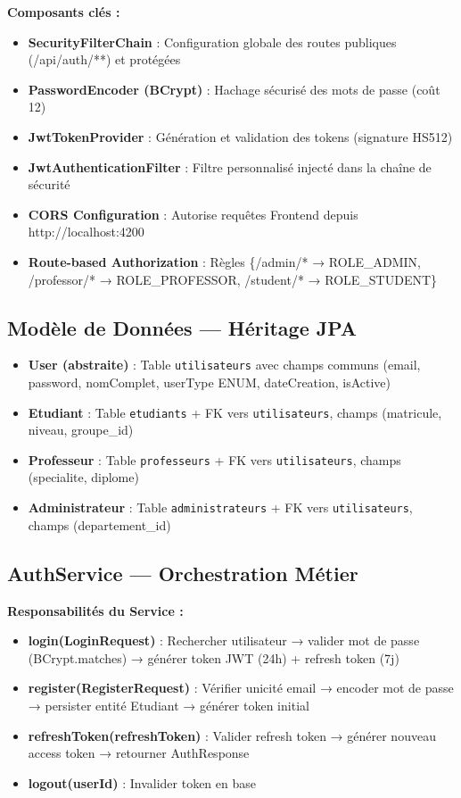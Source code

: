 \documentclass[12pt,a4paper]{report}
\begin{document}
\textbf{Composants clés :}
\begin{itemize}[itemsep=0.2em]
    \item \textbf{SecurityFilterChain} : Configuration globale des routes publiques (/api/auth/**) et protégées
    \item \textbf{PasswordEncoder (BCrypt)} : Hachage sécurisé des mots de passe (coût 12)
    \item \textbf{JwtTokenProvider} : Génération et validation des tokens (signature HS512)
    \item \textbf{JwtAuthenticationFilter} : Filtre personnalisé injecté dans la chaîne de sécurité
    \item \textbf{CORS Configuration} : Autorise requêtes Frontend depuis http://localhost:4200
    \item \textbf{Route-based Authorization} : Règles \{/admin/* → ROLE\_ADMIN, /professor/* → ROLE\_PROFESSOR, /student/* → ROLE\_STUDENT\}
\end{itemize}

\subsection{Modèle de Données — Héritage JPA}

\begin{itemize}[itemsep=0.2em]
    \item \textbf{User (abstraite)} : Table \texttt{utilisateurs} avec champs communs (email, password, nomComplet, userType ENUM, dateCreation, isActive)
    \item \textbf{Etudiant} : Table \texttt{etudiants} + FK vers \texttt{utilisateurs}, champs (matricule, niveau, groupe\_id)
    \item \textbf{Professeur} : Table \texttt{professeurs} + FK vers \texttt{utilisateurs}, champs (specialite, diplome)
    \item \textbf{Administrateur} : Table \texttt{administrateurs} + FK vers \texttt{utilisateurs}, champs (departement\_id)
\end{itemize}

\subsection{AuthService — Orchestration Métier}

\textbf{Responsabilités du Service :}
\begin{itemize}[itemsep=0.2em]
    \item \textbf{login(LoginRequest)} : Rechercher utilisateur → valider mot de passe (BCrypt.matches) → générer token JWT (24h) + refresh token (7j)
    \item \textbf{register(RegisterRequest)} : Vérifier unicité email → encoder mot de passe → persister entité Etudiant → générer token initial
    \item \textbf{refreshToken(refreshToken)} : Valider refresh token → générer nouveau access token → retourner AuthResponse
    \item \textbf{logout(userId)} : Invalider token en base
\end{itemize}
\end{document}
